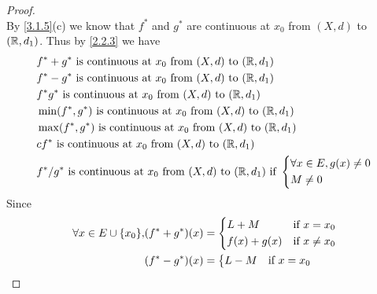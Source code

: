 \begin{proof}
\[  \]
  By \cref{3.1.5}(c) we know that \(f^*\) and \(g^*\) are continuous at \(x_0\) from \((X, d)\) to \((\mathbb{R}, d_1)\).
  Thus by \cref{2.2.3} we have
  \begin{align*}
     & f^* + g^* \text{ is continuous at } x_0 \text{ from } (X, d) \text{ to } (\mathbb{R}, d_1)                                          \\
     & f^* - g^* \text{ is continuous at } x_0 \text{ from } (X, d) \text{ to } (\mathbb{R}, d_1)                                          \\
     & f^* g^* \text{ is continuous at } x_0 \text{ from } (X, d) \text{ to } (\mathbb{R}, d_1)                                            \\
     & \min(f^*, g^*) \text{ is continuous at } x_0 \text{ from } (X, d) \text{ to } (\mathbb{R}, d_1)                                     \\
     & \max(f^*, g^*) \text{ is continuous at } x_0 \text{ from } (X, d) \text{ to } (\mathbb{R}, d_1)                                     \\
     & c f^* \text{ is continuous at } x_0 \text{ from } (X, d) \text{ to } (\mathbb{R}, d_1)                                              \\
     & f^* / g^* \text{ is continuous at } x_0 \text{ from } (X, d) \text{ to } (\mathbb{R}, d_1) \text{ if } \begin{dcases}
                                                                                                        \forall x \in E, g(x) \neq 0 \\
                                                                                                        M \neq 0
                                                                                                      \end{dcases}
  \end{align*}
  Since
  \begin{align*}
    \forall x \in E \cup \set{x_0}, & (f^* + g^*)(x) = \begin{dcases}
                                                         L + M       & \text{if } x = x_0    \\
                                                         f(x) + g(x) & \text{if } x \neq x_0
                                                       \end{dcases}                     \\
                                    & (f^* - g^*)(x) = \begin{dcases}
                                                         L - M       & \text{if } x = x_0    \\

\end{dcases}
\end{align*}
\end{proof}
